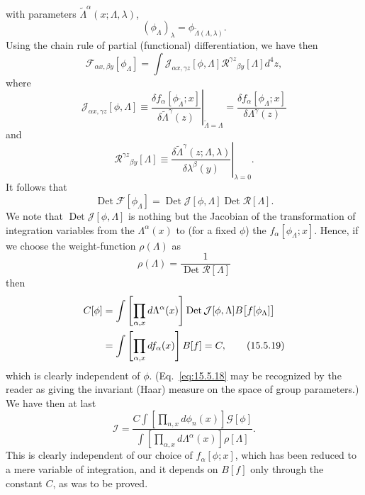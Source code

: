 with parameters $\widetilde\Lambda^\alpha(x;\Lambda,\lambda)$,
\begin{equation}
  (\phi_\Lambda)_\lambda=\phi_{\widetilde\Lambda(\Lambda,\lambda)}.
  \tag{15.5.13}\label{eq:15.5.13}
\end{equation}
Using the chain rule of partial (functional) differentiation, we have then
\begin{equation}
  \mathcal F_{\alpha x,\beta y}[\phi_\Lambda]
  =\int\mathcal J_{\alpha x,\gamma z}[\phi,\Lambda]
  \mathcal R^{\gamma z}{}_{\beta y}[\Lambda]d^4z,
  \tag{15.5.14}\label{eq:15.5.14}
\end{equation}
where
\begin{equation}
  \mathcal J_{\alpha x,\gamma z}[\phi,\Lambda]
  \equiv\left.\frac{\delta f_\alpha[\phi_{\widetilde\Lambda};x]}
  {\delta\widetilde\Lambda^\gamma(z)}\right|_{\widetilde\Lambda=\Lambda}
  =\frac{\delta f_\alpha[\phi_\Lambda;x]}{\delta\Lambda^\gamma(z)}
  \tag{15.5.15}\label{eq:15.5.15}
\end{equation}
and
\begin{equation}
  \mathcal R^{\gamma z}{}_{\beta y}[\Lambda]
  \equiv\left.\frac{\delta\widetilde\Lambda^\gamma(z;\Lambda,\lambda)}
  {\delta\lambda^\beta(y)}\right|_{\lambda=0}.
  \tag{15.5.16}\label{eq:15.5.16}
\end{equation}
It follows that
\begin{equation}
  \operatorname{Det}\mathcal F[\phi_\Lambda]
  =\operatorname{Det}\mathcal J[\phi,\Lambda]
  \operatorname{Det}\mathcal R[\Lambda].
  \tag{15.5.17}\label{eq:15.5.17}
\end{equation}
We note that $\operatorname{Det}\mathcal J[\phi,\Lambda]$ is nothing but the
Jacobian of the transformation of integration variables from the
$\Lambda^\alpha(x)$ to (for a fixed $\phi$) the $f_\alpha[\phi_\Lambda;x]$.
Hence, if we choose the weight-function $\rho(\Lambda)$ as
\begin{equation}
  \rho(\Lambda)=\frac{1}{\operatorname{Det}\mathcal R[\Lambda]}
  \tag{15.5.18}\label{eq:15.5.18}
\end{equation}
then
\begin{align}
  C[\phi]
  &=\int\left[\prod_{\alpha,x}d\Lambda^\alpha(x)\right]
  \operatorname{Det}\mathcal J[\phi,\Lambda]
  B\bigl[f[\phi_\Lambda]\bigr]
  \notag\\
  &=\int\left[\prod_{\alpha,x}df_\alpha(x)\right]B[f]=C,
  \tag{15.5.19}\label{eq:15.5.19}
\end{align}
which is clearly independent of $\phi$. (Eq.~\eqref{eq:15.5.18} may be
recognized by the reader as giving the invariant (Haar) measure on the space
of group parameters.) We have then at last
\begin{equation}
  \mathcal I=
  \frac{C\displaystyle\int\left[\prod_{n,x}d\phi_n(x)\right]
  \mathcal G[\phi]}
  {\displaystyle\int\left[\prod_{\alpha,x}d\Lambda^\alpha(x)\right]
  \rho[\Lambda]}.
  \tag{15.5.20}\label{eq:15.5.20}
\end{equation}
This is clearly independent of our choice of $f_\alpha[\phi;x]$, which has
been reduced to a mere variable of integration, and it depends on $B[f]$ only
through the constant $C$, as was to be proved.

